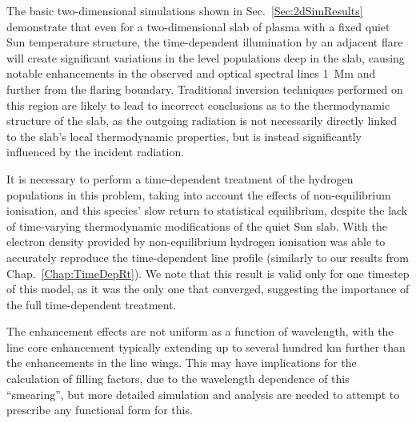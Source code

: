The basic two-dimensional simulations shown in Sec.~\ref{Sec:2dSimResults} demonstrate that even for a two-dimensional slab of plasma with a fixed quiet Sun temperature structure, the time-dependent illumination by an adjacent flare will create significant variations in the level populations deep in the slab, causing notable enhancements in the observed \Ha{} and \CaLine{} optical spectral lines \SI{1}{\mega\metre} and further from the flaring boundary.
Traditional inversion techniques performed on this region are likely to lead to incorrect conclusions as to the thermodynamic structure of the slab, as the outgoing radiation is not necessarily directly linked to the slab's local thermodynamic properties, but is instead significantly influenced by the incident radiation.

It is necessary to perform a time-dependent treatment of the hydrogen populations in this problem, taking into account the effects of non-equilibrium ionisation, and this species' slow return to statistical equilibrium, despite the lack of time-varying thermodynamic modifications of the quiet Sun slab.
With the electron density provided by non-equilibrium hydrogen ionisation was able to accurately reproduce the time-dependent \CaLine{} line profile (similarly to our results from Chap.~\ref{Chap:TimeDepRt}).
We note that this result is valid only for one timestep of this model, as it was the only one that converged, suggesting the importance of the full time-dependent treatment.

The enhancement effects are not uniform as a function of wavelength, with the line core enhancement typically extending up to several hundred \si{\kilo\metre} further than the enhancements in the line wings.
This may have implications for the calculation of filling factors, due to the wavelength dependence of this ``smearing'', but more detailed simulation and analysis are needed to attempt to prescribe any functional form for this.

